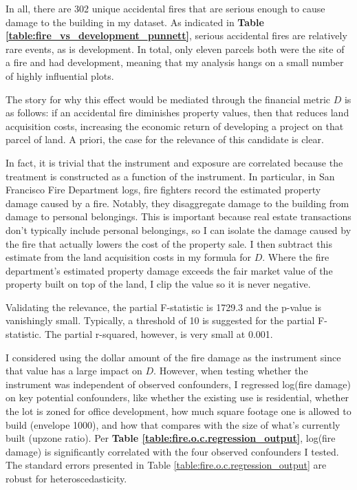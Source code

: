 \documentclass[a4paper,12pt]{article}
\begin{document}
In all, there are 302 unique accidental fires that are serious enough to cause damage to the building in my dataset. As indicated in \textbf{Table \ref{table:fire_vs_development_punnett}}, serious accidental fires are relatively rare events, as is development. In total, only eleven parcels both were the site of a fire and had development, meaning that my analysis hangs on a small number of highly influential plots.

The story for why this effect would be mediated through the financial metric $D$ is as follows: if an accidental fire diminishes property values, then that reduces land acquisition costs, increasing the economic return of developing a project on that parcel of land. A priori, the case for the relevance of this candidate is clear.

In fact, it is trivial that the instrument and exposure are correlated because the treatment is constructed as a function of the instrument. In particular, in San Francisco Fire Department logs, fire fighters record the estimated property damage caused by a fire. Notably, they disaggregate damage to the building from damage to personal belongings. This is important because real estate transactions don't typically include personal belongings, so I can isolate the damage caused by the fire that actually lowers the cost of the property sale. I then subtract this estimate from the land acquisition costs in my formula for $D$. Where the fire department's estimated property damage exceeds the fair market value of the property built on top of the land, I clip the value so it is never negative.

Validating the relevance, the partial F-statistic is 1729.3 and the p-value is vanishingly small. Typically, a threshold of 10 is suggested for the partial F-statistic. The partial r-squared, however, is very small at 0.001.

I considered using the dollar amount of the fire damage as the instrument since that value has a large impact on $D$. However, when testing whether the instrument was independent of observed confounders, I regressed log(fire damage) on key potential confounders, like whether the existing use is residential, whether the lot is zoned for office development, how much square footage one is allowed to build (envelope 1000), and how that compares with the size of what's currently built (upzone ratio). Per \textbf{Table \ref{table:fire.o.c.regression_output}}, log(fire damage) is significantly correlated with the four observed confounders I tested. The standard errors presented in Table \ref{table:fire.o.c.regression_output} are robust for heteroscedasticity.
\end{document}
